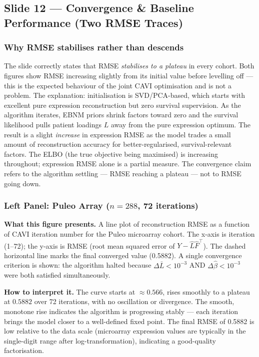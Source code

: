 \documentclass[11pt]{article}
\begin{document}
\subsection*{Slide 12 --- Convergence \& Baseline Performance (Two RMSE Traces)}

\subsubsection*{Why RMSE stabilises rather than descends}

The slide correctly states that RMSE \emph{stabilises to a plateau} in every cohort. Both figures show RMSE increasing slightly from its initial value before levelling off --- this is the expected behaviour of the joint CAVI optimisation and is not a problem. The explanation: initialisation is SVD/PCA-based, which starts with excellent pure expression reconstruction but zero survival supervision. As the algorithm iterates, EBNM priors shrink factors toward zero and the survival likelihood pulls patient loadings $L$ away from the pure expression optimum. The result is a slight \emph{increase} in expression RMSE as the model trades a small amount of reconstruction accuracy for better-regularised, survival-relevant factors. The ELBO (the true objective being maximised) is increasing throughout; expression RMSE alone is a partial measure. The convergence claim refers to the algorithm settling --- RMSE reaching a plateau --- not to RMSE going down.

\subsubsection*{Left Panel: Puleo Array ($n = 288$, 72 iterations)}

\textbf{What this figure presents.} A line plot of reconstruction RMSE as a function of CAVI iteration number for the Puleo microarray cohort. The x-axis is iteration (1--72); the y-axis is RMSE (root mean squared error of $Y - \hat{L}\hat{F}^\top$). The dashed horizontal line marks the final converged value (0.5882). A single convergence criterion is shown: the algorithm halted because $\Delta\bar{L} < 10^{-3}$ AND $\Delta\hat{\beta} < 10^{-3}$ were both satisfied simultaneously.

\textbf{How to interpret it.} The curve starts at $\approx 0.566$, rises smoothly to a plateau at $0.5882$ over 72 iterations, with no oscillation or divergence. The smooth, monotone rise indicates the algorithm is progressing stably --- each iteration brings the model closer to a well-defined fixed point. The final RMSE of 0.5882 is low relative to the data scale (microarray expression values are typically in the single-digit range after log-transformation), indicating a good-quality factorisation.
\end{document}
